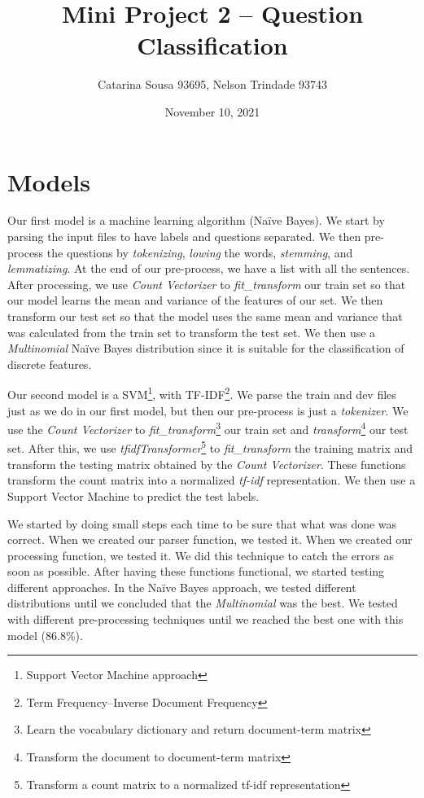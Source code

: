 \documentclass[11pt]{article}
\title{Mini Project 2 – Question Classification}
\author{Catarina Sousa 93695, Nelson Trindade 93743}
\date{November 10, 2021}
\begin{document}
\maketitle

\section{Models}
Our first model is a machine learning algorithm (Naïve Bayes). We start by parsing the input files to have labels and questions separated. We then pre-process the questions by \emph{tokenizing}, \emph{lowing} the words, \emph{stemming}, and \emph{lemmatizing}. At the end of our pre-process, we have a list with all the sentences. After processing, we use \emph{Count Vectorizer} to \emph{fit\_transform} our train set so that our model learns the mean and variance of the features of our set. We then transform our test set so that the model uses the same mean and variance that was calculated from the train set to transform the test set. We then use a \emph{Multinomial} Naïve Bayes distribution since it is suitable for the classification of discrete features.

Our second model is a SVM\footnote[1]{Support Vector Machine approach}, with TF-IDF\footnote[2]{Term Frequency–Inverse Document Frequency}. We parse the train and dev files just as we do in our first model, but then our pre-process is just a \emph{tokenizer}. We use the \emph{Count Vectorizer} to \emph{fit\_transform}\footnote[3]{Learn the vocabulary dictionary and return document-term matrix} our train set and \emph{transform}\footnote[4]{Transform the document to document-term matrix} our test set. After this, we use \emph{tfidfTransformer}\footnote[5]{Transform a count matrix to a normalized tf-idf representation} to \emph{fit\_transform} the training matrix and transform the testing matrix obtained by the \emph{Count Vectorizer}. These functions transform the count matrix into a normalized \emph{tf-idf} representation. We then use a Support Vector Machine to predict the test labels.

We started by doing small steps each time to be sure that what was done was correct. When we created our parser function, we tested it. When we created our processing function, we tested it. We did this technique to catch the errors as soon as possible. After having these functions functional, we started testing different approaches. 
In the Naïve Bayes approach, we tested different distributions until we concluded that the \emph{Multinomial} was the best. We tested with different pre-processing techniques until we reached the best one with this model (86.8\%).
\end{document}
